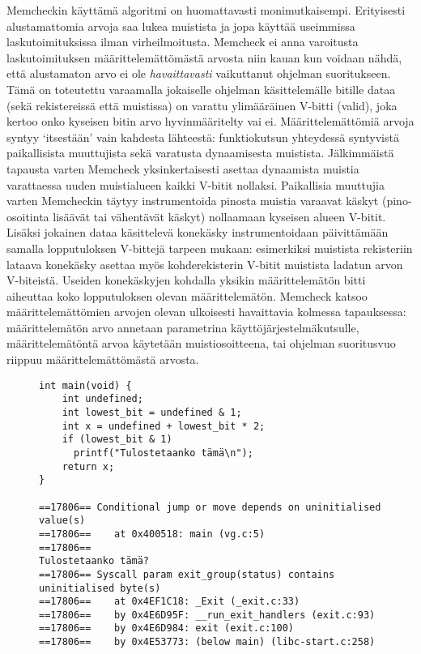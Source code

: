 Memcheckin käyttämä algoritmi on huomattavasti monimutkaisempi.
Erityisesti alustamattomia arvoja saa lukea muistista ja jopa käyttää useimmissa laskutoimituksissa ilman virheilmoitusta.
Memcheck ei anna varoitusta laskutoimituksen määrittelemättömästä arvosta niin kauan kun voidaan nähdä,
että alustamaton arvo ei ole \emph{havaittavasti} vaikuttanut ohjelman suoritukseen.
Tämä on toteutettu varaamalla jokaiselle ohjelman käsittelemälle bitille dataa (sekä rekistereissä että muistissa)
on varattu ylimääräinen V-bitti (valid),
joka kertoo onko kyseisen bitin arvo hyvinmääritelty vai ei.
Määrittelemättömiä arvoja syntyy `itsestään' vain kahdesta lähteestä:
funktiokutsun yhteydessä syntyvistä paikallisista muuttujista sekä varatusta dynaamisesta muistista.
Jälkimmäistä tapausta varten Memcheck yksinkertaisesti asettaa dynaamista muistia varattaessa uuden muistialueen kaikki V-bitit nollaksi.
Paikallisia muuttujia varten Memcheckin täytyy instrumentoida pinosta muistia varaavat käskyt (pino-osoitinta lisäävät tai vähentävät käskyt)
nollaamaan kyseisen alueen V-bitit.
Lisäksi jokainen dataa käsittelevä konekäsky instrumentoidaan päivittämään samalla lopputuloksen V-bittejä tarpeen mukaan:
esimerkiksi muistista rekisteriin lataava konekäsky asettaa myös kohderekisterin V-bitit muistista ladatun arvon V-biteistä.
Useiden konekäskyjen kohdalla yksikin määrittelemätön bitti aiheuttaa koko lopputuloksen olevan määrittelemätön.
Memcheck katsoo määrittelemättömien arvojen olevan ulkoisesti havaittavia kolmessa tapauksessa:
määrittelemätön arvo annetaan parametrina käyttöjärjestelmäkutsulle,
määrittelemätöntä arvoa käytetään muistiosoitteena,
tai ohjelman suoritusvuo riippuu määrittelemättömästä arvosta.

\begin{figure}
\begin{verbatim}
int main(void) {
    int undefined;
    int lowest_bit = undefined & 1;
    int x = undefined + lowest_bit * 2;
    if (lowest_bit & 1)
      printf("Tulostetaanko tämä\n");
    return x;
}

==17806== Conditional jump or move depends on uninitialised value(s)
==17806==    at 0x400518: main (vg.c:5)
==17806==
Tulostetaanko tämä?
==17806== Syscall param exit_group(status) contains uninitialised byte(s)
==17806==    at 0x4EF1C18: _Exit (_exit.c:33)
==17806==    by 0x4E6D95F: __run_exit_handlers (exit.c:93)
==17806==    by 0x4E6D984: exit (exit.c:100)
==17806==    by 0x4E53773: (below main) (libc-start.c:258)
\end{verbatim}

\caption{}
\end{figure}

